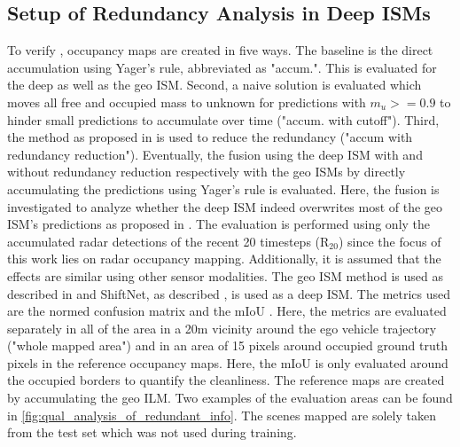 \subsection{Setup of Redundancy Analysis in Deep ISMs}
\label{subsec:setup_of_red_analy}
To verify , occupancy maps are created in five ways. The baseline is the direct accumulation using Yager's rule, abbreviated as "accum.". This is evaluated for the deep as well as the geo ISM. Second, a naive solution is evaluated which moves all free and occupied mass to unknown for predictions with $m_u>=0.9$ to hinder small predictions to accumulate over time ("accum. with cutoff"). Third, the method as proposed in  is used to reduce the redundancy ("accum with redundancy reduction"). Eventually, the fusion using the deep ISM with and without redundancy reduction respectively with the geo ISMs by directly accumulating the predictions using Yager's rule is evaluated. Here, the fusion is investigated to analyze whether the deep ISM indeed overwrites most of the geo ISM's predictions as proposed in .
%
The evaluation is performed using only the accumulated radar detections of the recent 20 timesteps (R$_{20}$) since the focus of this work lies on radar occupancy mapping. Additionally, it is assumed that the effects are similar using other sensor modalities. The geo ISM method is used as described in  and ShiftNet, as described , is used as a deep ISM.
%
The metrics used are the normed confusion matrix  and the mIoU . Here, the metrics are evaluated separately in all of the area in a 20m vicinity around the ego vehicle trajectory ("whole mapped area") and in an area of 15 pixels around occupied ground truth pixels in the reference occupancy maps. Here, the mIoU is only evaluated around the occupied borders to quantify the cleanliness. The reference maps are created by accumulating the geo ILM. Two examples of the evaluation areas can be found in \ref{fig:qual_analysis_of_redundant_info}. The scenes mapped are solely taken from the test set which was not used during training.
%
